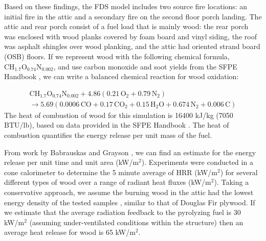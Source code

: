 \documentclass[11pt,oneside]{book}
\renewcommand{\C}{\mbox{C}}
\renewcommand{\H}{\mbox{H}}
\renewcommand{\O}{\mbox{O}}
\newcommand{\N}{\mbox{N}}
\begin{document}
Based on these findings, the FDS model includes two source fire locations: an initial fire in the attic and a secondary fire on the second floor porch landing. The attic and rear porch consist of a fuel load that is mainly wood: the rear porch was enclosed with wood planks covered by foam board and vinyl siding, the roof was asphalt shingles over wood planking, and the attic had oriented strand board (OSB) floors. If we represent wood with the following chemical formula, $\C\H_{1.7}\O_{0.74}\N_{0.002}$, and use carbon monoxide and soot yields from the SFPE Handbook \cite{SFPE:Tewarson}, we can write a balanced chemical reaction for wood oxidation:

\begin{multline}
\C\H_{1.7}\O_{0.74}\N_{0.002} + 4.86(0.21\,\O_{2} + 0.79\,\N_{2}) \\ 
\rightarrow 5.69(0.0006\,\C\O + 0.17\,\C\O_{2} + 0.15\,\H_{2}\O + 0.674\,\N_{2} + 0.006\,\C)
\label{eq:wood_comb}
\end{multline}
The heat of combustion of wood for this simulation is 16400 kJ/kg (7050 BTU/lb), based on data provided in the SFPE Handbook \cite{SFPE:Tewarson}. The heat of combustion quantifies the energy release per unit mass of the fuel.

From work by Babrauskas and Grayson \cite{babrauskas1990}, we can find an estimate for the energy release per unit time and unit area (kW/m$^2$). Experiments were conducted in a cone calorimeter to determine the 5 minute average of HRR (kW/m$^2$) for several different types of wood over a range of radiant heat fluxes (kW/m$^2$). Taking a conservative approach, we assume the burning wood in the attic had the lowest energy density of the tested samples \cite{babrauskas1990}, similar to that of Douglas Fir plywood. If we estimate that the average radiation feedback to the pyrolyzing fuel is 30 kW/m$^2$ (assuming under-ventilated conditions within the structure) then an average heat release for wood is 65 kW/m$^2$.
\end{document}
